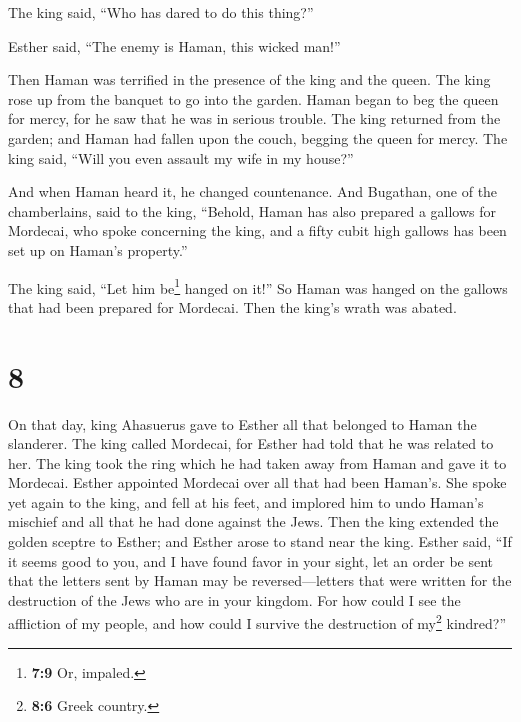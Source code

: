  The king said, ``Who has dared to do this thing?''

 Esther said, ``The enemy is Haman, this wicked man!''

Then Haman was terrified in the presence of the king and the queen.
 The king rose up from the banquet to go into the garden.
Haman began to beg the queen for mercy, for he saw that he was in
serious trouble.  The king returned from the garden; and
Haman had fallen upon the couch, begging the queen for mercy. The king
said, ``Will you even assault my wife in my house?''

And when Haman heard it, he changed countenance.  And
Bugathan, one of the chamberlains, said to the king, ``Behold, Haman has
also prepared a gallows for Mordecai, who spoke concerning the king, and
a fifty cubit high gallows has been set up on Haman's property.''

The king said, ``Let him be\footnote{\textbf{7:9} Or, impaled.} hanged
on it!''  So Haman was hanged on the gallows that had
been prepared for Mordecai. Then the king's wrath was abated.

\hypertarget{section-7}{%
\section{8}\label{section-7}}

 On that day, king Ahasuerus gave to Esther all that
belonged to Haman the slanderer. The king called Mordecai, for Esther
had told that he was related to her.  The king took the
ring which he had taken away from Haman and gave it to Mordecai. Esther
appointed Mordecai over all that had been Haman's.  She
spoke yet again to the king, and fell at his feet, and implored him to
undo Haman's mischief and all that he had done against the Jews.
 Then the king extended the golden sceptre to Esther; and
Esther arose to stand near the king.  Esther said, ``If it
seems good to you, and I have found favor in your sight, let an order be
sent that the letters sent by Haman may be reversed---letters that were
written for the destruction of the Jews who are in your kingdom.
 For how could I see the affliction of my people, and how
could I survive the destruction of my\footnote{\textbf{8:6} Greek
  country.} kindred?''

